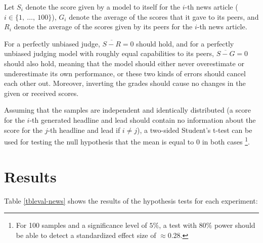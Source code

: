 \documentclass[UTF8,noindent,nohyp,parspace,titlepage,a4paper,12pt]{article}
\begin{document}
      Let $S_i$ denote the score given by a model to itself for the $i$-th news
      article ($i \in \{ 1,\ \dots,\ 100 \}$), $G_i$ denote the average of the
      scores that it gave to its peers, and $R_i$ denote the average of the
      scores given by its peers for the $i$-th news article.

      For a perfectly unbiased judge, $\overline{S - R} = 0$ should hold, and
      for a perfectly unbiased judging model with roughly equal capabilities to
      its peers, $\overline{S - G} = 0$ should also hold, meaning that the
      model should either never overestimate or underestimate its own
      performance, or these two kinds of errors should cancel each other out.
      Moreover, inverting the grades should cause no changes in the given or
      received scores.

      Assuming that the samples are independent and identically distributed
      (a score for the $i$-th generated headline and lead should contain no
      information about the score for the $j$-th headline and lead if
      $i \neq j$), a two-sided Student's t-test can be used for testing the null
      hypothesis that the mean is equal to 0 in both cases \footnote{For
      100 samples and a significance level of $5\%$, a test with $80\%$ power
      should be able to detect a standardized effect size of $\approx 0.28$.}.

\clearpage

  \section{Results}

    Table \ref{tbleval-news} shows the results of the hypothesis tests for each
    experiment:
\end{document}
